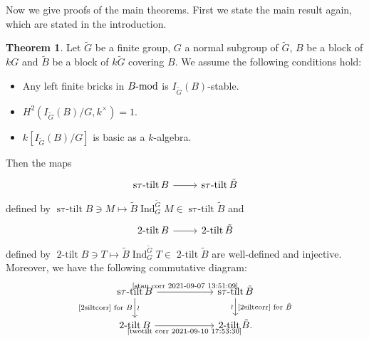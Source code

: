 \documentclass[pdftex,a4paper]{article}
\numberwithin{equation}{subsection}
\theoremstyle{definition}
\newtheorem{theorem}{Theorem}[section]
\newcommand{\lmod}{\operatorname{\mathrm{\hspace{-2pt}-mod}}}
\newcommand{\twotilt}{\operatorname{\mathrm{2-tilt}}}
\newcommand{\induc}{{\operatorname{Ind}\nolimits}}
\newcommand{\stautilt}{\operatorname{\mathrm{s\tau-tilt}}}
\newcommand{\inertiagp}{I}
\begin{document}
Now we give proofs of the main theorems. First we state the main result again, which are stated in the introduction.
\begin{theorem}\label{MT 2021-09-07 13:50:56}
	Let \(\tilde{G}\) be a finite group, \(G\) a normal subgroup of \(\tilde{G}\), \(B\) be a block of \(kG\) and \(\tilde{B}\) be a block of \(k\tilde{G}\) covering \(B\).
	We assume the following conditions hold:
	\begin{itemize}
		\item Any left finite bricks in \(B\lmod\) is \(\inertiagp_{\tilde G}(B)\)-stable.
		\item \(H^2(\inertiagp_{\tilde{G}}(B)/G,k^\times)=1\).
		\item \(k[\inertiagp_{\tilde{G}}(B)/G]\) is basic as a \(k\)-algebra.
	\end{itemize}
	Then the maps
	\begin{equation}\label{stau corr 2021-09-07 13:51:09}
		\begin{tikzcd}[ampersand replacement=\&,row sep=1pt]
			\stautilt B \ar[r]\&\stautilt \tilde{B}\\
		\end{tikzcd}
	\end{equation}
	defined by \(\stautilt B\ni M\mapsto \tilde{B}\induc_G^{\tilde{G}} M \in \stautilt \tilde{B}\) and
	\begin{equation}\label{twotilt corr 2021-09-10 17:53:30}
		\begin{tikzcd}[ampersand replacement=\&,row sep=1pt]
			\twotilt B \ar[r]\&\twotilt \tilde{B}\\
		\end{tikzcd}
	\end{equation}
	defined by \(\twotilt B\ni T\mapsto \tilde{B}\induc_G^{\tilde{G}} T \in \twotilt \tilde{B}\) are well-defined and injective.
	Moreover, we have the following commutative diagram:
	\begin{equation}\label{cd 2021-12-16 20:06:39}
		\begin{tikzcd}[ampersand replacement=\&, column sep=2cm]
			\stautilt B\ar[d,"\text{\eqref{2siltcorr} for \(B\)}"',"\wr"] \ar[r,"\text{\eqref{stau corr 2021-09-07 13:51:09}}"]\&\stautilt \tilde{B} \ar[d,"\text{\eqref{2siltcorr} for \(\tilde{B}\)}","\wr"']\\
			\twotilt B\ar[r,"\text{\eqref{twotilt corr 2021-09-10 17:53:30}}"']\&\twotilt \tilde{B}.
		\end{tikzcd}
	\end{equation}
\end{theorem}
\end{document}
